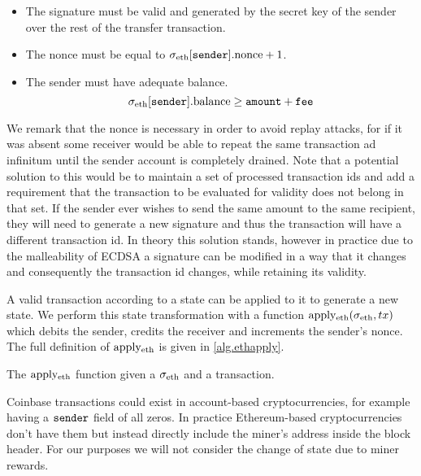 \begin{itemize}
    \item The signature must be valid and generated by the secret key of the sender over the rest of the transfer transaction.
    \item The nonce must be equal to $\sigma_\text{eth}[\texttt{sender}].\text{nonce} + 1$.
    \item The sender must have adequate balance.
    \[
        \sigma_\text{eth}[\texttt{sender}].\text{balance} \ge \texttt{amount}+\texttt{fee}
    \]
\end{itemize}

We remark that the nonce is necessary in order to avoid replay attacks, for if it was absent some receiver would be able to repeat the same transaction ad infinitum until the sender account is completely drained. Note that a potential solution to this would be to maintain a set of processed transaction ids and add a requirement that the transaction to be evaluated for validity does not belong in that set. If the sender ever wishes to send the same amount to the same recipient, they will need to generate a new signature and thus the transaction will have a different transaction id. In theory this solution stands, however in practice due to the malleability of ECDSA a signature can be modified in a way that it changes and consequently the transaction id changes, while retaining its validity.

\def\ethapply{\text{apply}\textsubscript{eth}}

A valid transaction according to a state can be applied to it to generate a new state. We perform this state transformation with a function $\ethapply(\ethstate, tx)$ which debits the sender, credits the receiver and increments the sender's nonce. The full definition of $\ethapply$ is given in \cref{alg.ethapply}.

\begin{algorithm}[H]
    \caption{\label{alg.ethapply} The $\ethapply$ function given a $\ethstate$ and a transaction.}
    \begin{algorithmic}[1]
        \Function{$\ethapply$}{$\ethstate, tx$}
            \State\Return{$\ethstate$}
        \EndFunction
    \end{algorithmic}
\end{algorithm}

Coinbase transactions could exist in account-based cryptocurrencies, for example having a $\texttt{sender}$ field of all zeros. In practice Ethereum-based cryptocurrencies don't have them but instead directly include the miner's address inside the block header. For our purposes we will not consider the change of state due to miner rewards.


